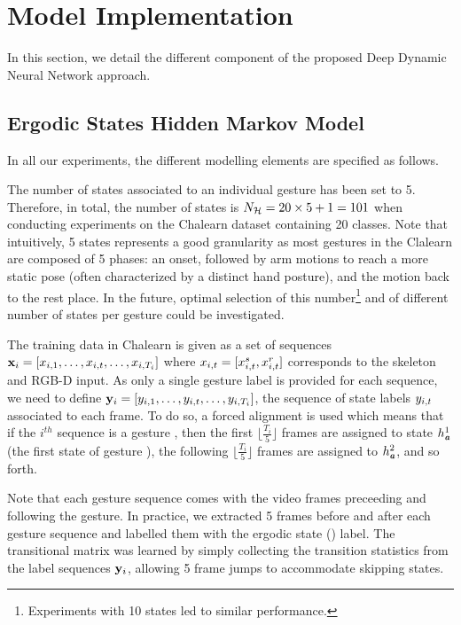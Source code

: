 

\section{Model Implementation}
\label{sec:ModelImplementation}

In this section, we detail the different component of the proposed Deep Dynamic Neural Network approach.

\subsection{Ergodic States Hidden Markov Model}

In all our experiments, the different modelling elements are specified as follows.

The number of states \nsig{} associated to an individual gesture has been set to 5.
Therefore, in total, the number of states is $N_{\mathcal{H}} = 20 \times 5 + 1 = 101$
when conducting  experiments on the Chalearn dataset containing 20 classes.
%
Note that intuitively, 5 states represents a good granularity as
most gestures in the Clalearn are composed of 5 phases: an onset, followed by arm motions to reach a more static pose
(often characterized by a distinct hand posture), and the motion back to the rest place.
%
In the future, optimal selection of this number\footnote{Experiments with 10 states led to similar performance.}
and of different number of states per gesture could be investigated.
%


The training data in Chalearn is given as a set of sequences
$\mathbf x_i=[x_{i,1}, \ldots,x_{i,t},\ldots, x_{i,T_i}]$
where $x_{i,t}=[x_{i,t}^s, x_{i,t}^r]$ corresponds to the skeleton and RGB-D input.
%
As only a single gesture label is provided for each sequence, we need to define
$\mathbf y_i=[y_{i,1}, \ldots,y_{i,t},\ldots, y_{i,T_i}]$,
the sequence of state labels $y_{i,t}$ associated to each frame.
%
To do so, a forced alignment is used which means that if the $i^{th}$ sequence is a gesture \gesturea{}, then the first $\lfloor \frac{T_i}{5} \rfloor$ frames are assigned to state $h_{\textbf{\emph{a}}}^1$ (the first state of gesture \gesturea{}),
the following $\lfloor \frac{T_i}{5} \rfloor$ frames are assigned to $h_{\textbf{\emph{a}}}^2$, and so forth.

Note that each gesture sequence comes with the video frames preceeding and following the gesture.
In practice, we extracted 5 frames before and after each gesture sequence and labelled them
with the ergodic state (\ergodicstate) label.
%
The transitional matrix \transitionmatrix{} was learned by simply  collecting the transition statistics from the label sequences $\mathbf y_i$, allowing 5 frame jumps to accommodate skipping states.

